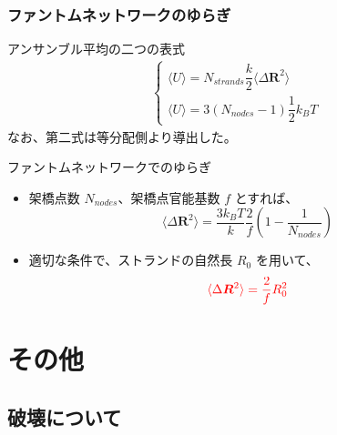 \documentclass[12pt, dvipdfmx]{beamer}
\begin{document}
\begin{frame}
	\frametitle{ファントムネットワークのゆらぎ}
		\begin{block}{アンサンブル平均の二つの表式}
			\scriptsize
			\begin{align*}
				\begin{cases}
					\langle U \rangle = N_{strands} \dfrac{k}{2} \langle \Delta \bm{R}^2 \rangle \\
					\langle U \rangle = 3(N_{nodes}-1) \dfrac{1}{2} k_B T
				\end{cases}
			\end{align*}
			\normalsize
			なお、第二式は等分配側より導出した。
		\end{block}
		\begin{exampleblock}{ファントムネットワークでのゆらぎ}
			\begin{itemize}
				\item 架橋点数 $N_{nodes}$、架橋点官能基数 $f$ とすれば、
					\scriptsize
					\begin{equation*}
					\langle \Delta \bm{R}^2 \rangle = \dfrac{3k_B T}{k} \dfrac{2}{f} \left( 1-\dfrac{1}{N_{nodes}} \right)
					\end{equation*}
					\normalsize
				\item 適切な条件で、ストランドの自然長 $R_0$ を用いて、
					\scriptsize
					\begin{equation*}
					\color{red}
					\langle \Delta \bm{R}^2 \rangle = \dfrac{2}{f} R_0^2
					\end{equation*}
			\end{itemize}
		\end{exampleblock}
\end{frame}

\section{その他}
\subsection{破壊について}
\end{document}
